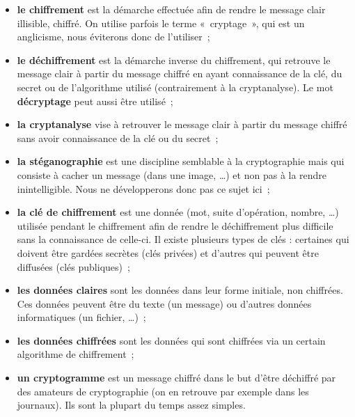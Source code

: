 \begin{itemize}

\item {\sffamily\textbf{le chiffrement}} est la démarche effectuée afin de rendre
  le message clair illisible, chiffré. On utilise parfois le terme
  «~cryptage~», qui est un anglicisme, nous éviterons donc de
  l'utiliser~;

\item {\sffamily\textbf{le déchiffrement}} est la démarche inverse du chiffrement, qui retrouve
  le message clair à partir du message chiffré en ayant connaissance
  de la clé, du secret ou de l'algorithme utilisé (contrairement à la
  cryptanalyse). Le mot {\sffamily\textbf{décryptage}} peut aussi
être utilisé~;
\item {\sffamily\textbf{la cryptanalyse}} vise à retrouver le
message clair à partir du message chiffré sans avoir connaissance
de la clé ou du secret~;

\item {\sffamily\textbf{la stéganographie}} est une discipline semblable à la
  cryptographie mais qui consiste à cacher un message (dans une
  image, \dots) et non pas à la rendre inintelligible. Nous ne
développerons donc pas ce sujet ici~;

\item {\sffamily\textbf{la clé de chiffrement}} est une donnée (mot, suite d'opération,
  nombre, \dots) utilisée pendant le chiffrement afin de rendre le
  déchiffrement plus difficile sans la connaissance de celle-ci. Il
  existe plusieurs types de clés : certaines qui doivent être gardées
  secrètes (clés privées) et d'autres qui peuvent être diffusées
  (clés publiques)~;

\item {\sffamily\textbf{les données claires}} sont les données dans leur forme initiale, non
  chiffrées. Ces données peuvent être du texte (un message) ou d'autres
  données informatiques (un fichier, \dots)~;

\item {\sffamily\textbf{les données chiffrées}} sont les données qui
sont chiffrées via un certain
  algorithme de chiffrement~;

\item {\sffamily\textbf{un cryptogramme}} est un message chiffré
dans le but d'être déchiffré par des amateurs de cryptographie (on
en retrouve par exemple dans les journaux). Ils sont la plupart du
temps assez simples.
\end{itemize}
